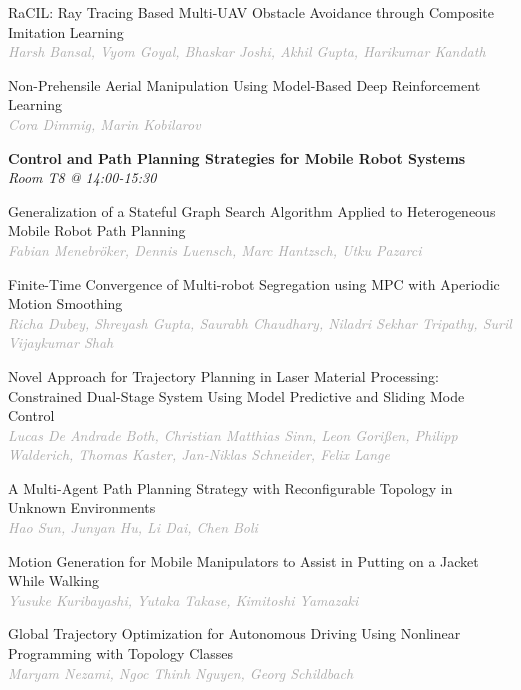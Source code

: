 \begin{multicols*}{2}
\small RaCIL: Ray Tracing Based Multi-UAV Obstacle Avoidance through Composite Imitation Learning\\ 
\footnotesize \textcolor{darkgray}{\textit{Harsh Bansal, Vyom  Goyal, Bhaskar  Joshi, Akhil  Gupta, Harikumar  Kandath}}

\small Non-Prehensile Aerial Manipulation Using Model-Based Deep Reinforcement Learning\\ 
\footnotesize \textcolor{darkgray}{\textit{Cora Dimmig, Marin  Kobilarov}}

\normalsize \textbf{Control and Path Planning Strategies for Mobile Robot Systems}\\
\small \textit{Room T8 @ 14:00-15:30}

\small Generalization of a Stateful Graph Search Algorithm Applied to Heterogeneous Mobile Robot Path Planning\\ 
\footnotesize \textcolor{darkgray}{\textit{Fabian Menebröker, Dennis  Luensch, Marc  Hantzsch, Utku  Pazarci}}

\small Finite-Time Convergence of Multi-robot Segregation using MPC with Aperiodic Motion Smoothing\\ 
\footnotesize \textcolor{darkgray}{\textit{Richa Dubey, Shreyash  Gupta, Saurabh  Chaudhary, Niladri Sekhar  Tripathy, Suril Vijaykumar  Shah}}

\small Novel Approach for Trajectory Planning in Laser Material Processing: Constrained Dual-Stage System Using Model Predictive and Sliding Mode Control\\ 
\footnotesize \textcolor{darkgray}{\textit{Lucas De Andrade Both, Christian Matthias  Sinn, Leon  Gorißen, Philipp  Walderich, Thomas  Kaster, Jan-Niklas  Schneider, Felix  Lange}}

\small A Multi-Agent Path Planning Strategy with Reconfigurable Topology in Unknown Environments\\ 
\footnotesize \textcolor{darkgray}{\textit{Hao Sun, Junyan  Hu, Li  Dai, Chen  Boli}}

\small Motion Generation for Mobile Manipulators to Assist in Putting on a Jacket While Walking\\ 
\footnotesize \textcolor{darkgray}{\textit{Yusuke Kuribayashi, Yutaka  Takase, Kimitoshi  Yamazaki}}

\small Global Trajectory Optimization for Autonomous Driving Using Nonlinear Programming with Topology Classes\\ 
\footnotesize \textcolor{darkgray}{\textit{Maryam Nezami, Ngoc Thinh  Nguyen, Georg  Schildbach}}


\end{multicols*}
